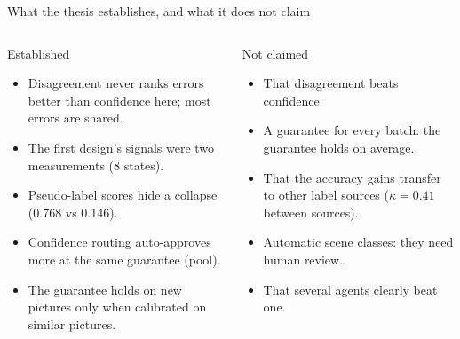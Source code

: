\documentclass[aspectratio=169,10pt]{beamer}
\begin{document}
\begin{frame}{What the thesis establishes, and what it does not claim}
\begin{columns}[T,onlytextwidth]
\begin{defbox}[colframe=okc,colbacktitle=okbg,coltitle=okc]{Established}
\begin{itemize}\setlength\itemsep{2pt}
\item Disagreement never ranks errors better than confidence here; most errors are shared.
\item The first design's signals were two measurements (8 states).
\item Pseudo-label scores hide a collapse (0.768 vs 0.146).
\item Confidence routing auto-approves more at the same guarantee (pool).
\item The guarantee holds on new pictures only when calibrated on similar pictures.
\end{itemize}
\end{defbox}
\begin{defbox}[colframe=pers,colbacktitle=persbg,coltitle=pers]{Not claimed}
\begin{itemize}\setlength\itemsep{2pt}
\item That disagreement beats confidence.
\item A guarantee for every batch: the guarantee holds on average.
\item That the accuracy gains transfer to other label sources ($\kappa = 0.41$ between sources).
\item Automatic scene classes: they need human review.
\item That several agents clearly beat one.
\end{itemize}
\end{defbox}
\end{columns}
\end{frame}
\end{document}
